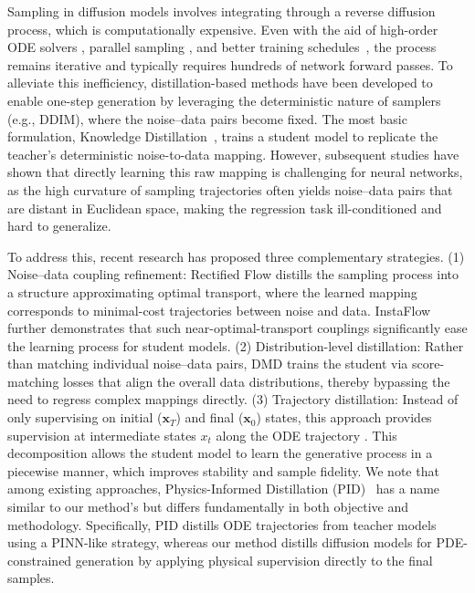 \documentclass{article}
\theoremstyle{plain}
\theoremstyle{definition}
\theoremstyle{remark}
\def\vx{{\bm{x}}}
\begin{document}
Sampling in diffusion models involves integrating through a reverse diffusion process, which is computationally expensive. Even with the aid of high-order ODE solvers \cite{maoutsa2020interactingode, song2021ddim, lu2022dpmdeterminsitc, lu2022dpmplusplusdeterminsitc, zhou2024fastdeterminsitc}, parallel sampling \cite{shih2024paralleldeterminsitc}, and better training schedules~\cite{karras2022edm, nichol2021improved, liu2023flow, liu2023rectifiedflow, liu2023instaflow}, the process remains iterative and typically requires hundreds of network forward passes. To alleviate this inefficiency, distillation-based methods have been developed to enable one-step generation by leveraging the deterministic nature of samplers (e.g., DDIM), where the noise–data pairs become fixed. The most basic formulation, Knowledge Distillation~\cite{vanilladistillation}, trains a student model to replicate the teacher's deterministic noise-to-data mapping. However, subsequent studies have shown that directly learning this raw mapping is challenging for neural networks, as the high curvature of sampling trajectories often yields noise–data pairs that are distant in Euclidean space, making the regression task ill-conditioned and hard to generalize.

To address this, recent research has proposed three complementary strategies. (1) Noise–data coupling refinement: Rectified Flow \cite{liu2023rectifiedflow} distills the sampling process into a structure approximating optimal transport, where the learned mapping corresponds to minimal-cost trajectories between noise and data. InstaFlow \cite{liu2023instaflow} further demonstrates that such near-optimal-transport couplings significantly ease the learning process for student models. (2) Distribution-level distillation: Rather than matching individual noise–data pairs, DMD \cite{yin2024dmd} trains the student via score-matching losses that align the overall data distributions, thereby bypassing the need to regress complex mappings directly. (3) Trajectory distillation: Instead of only supervising on initial ($\vx_T$) and final ($\vx_0$) states, this approach provides supervision at intermediate states $x_t$ along the ODE trajectory \cite{berthelot2023tract, zheng2023fastno, song2023consistencymodels, tee2024pid}. This decomposition allows the student model to learn the generative process in a piecewise manner, which improves stability and sample fidelity. We note that among existing approaches, Physics-Informed Distillation (PID)~\cite{tee2024pid} has a name similar to our method's but differs fundamentally in both objective and methodology. Specifically, PID distills ODE trajectories from teacher models using a PINN-like strategy, whereas our method distills diffusion models for PDE-constrained generation by applying physical supervision directly to the final samples.
\end{document}
